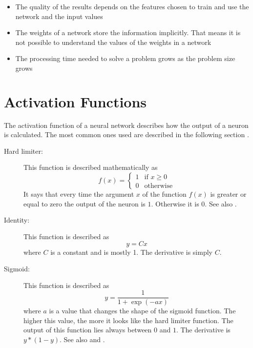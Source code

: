 \begin{itemize}
    \item The quality of the results depends on the features chosen to train and use the network and the input values
	\item The weights of a network store the information implicitly. That means it is not possible to understand the values of the weights in a network
	\item The processing time needed to solve a problem grows as the problem size grows
\end{itemize}

\section{Activation Functions}
\label{sec:activation}

The activation function of a neural network describes how the output of a neuron is calculated. The most common ones used are described in the following section \cite{nn_actfct}.

\begin{description}
	\item[Hard limiter:] This function is described mathematically as
\begin{equation}	f(x) =
	\begin{cases}
		1 & \text{if } x \ge 0 \\
		0 & \text{otherwise}
	\end{cases}
\end{equation}
It says that every time the argument $x$ of the function $f(x)$ is greater or equal to zero the output of the neuron is $1$. Otherwise it is $0$. See also \cite[p.178]{pattern}.

	\item[Identity:] This function is described as
\begin{equation} y = Cx \end{equation}
where $C$ is a constant and is mostly 1. The derivative is simply $C$.

	\item[Sigmoid:] This function is described as \begin{equation} y = \frac{1}{1+\exp(-ax)} \end{equation}
where $a$ is a value that changes the shape of the sigmoid function. The higher this value, the more it looks like the hard limiter function. The output of this function lies always between $0$ and $1$. The derivative is $y * (1 - y)$. See also \cite[p.149f]{neuralnetworks} and \cite[p.184]{pattern}.

\end{description}

